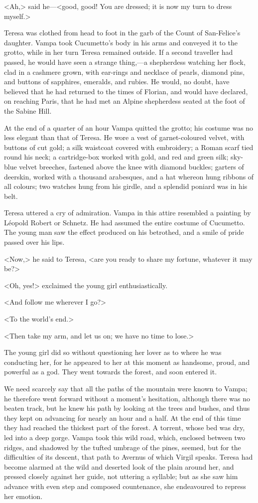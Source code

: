 {<Ah,> said he—<good, good! You are dressed; it is now my turn to dress myself.> 

Teresa was clothed from head to foot in the garb of the Count of San-Felice's daughter. Vampa took Cucumetto's body in his arms and conveyed it to the grotto, while in her turn Teresa remained outside. If a second traveller had passed, he would have seen a strange thing,—a shepherdess watching her flock, clad in a cashmere grown, with ear-rings and necklace of pearls, diamond pins, and buttons of sapphires, emeralds, and rubies. He would, no doubt, have believed that he had returned to the times of Florian, and would have declared, on reaching Paris, that he had met an Alpine shepherdess seated at the foot of the Sabine Hill. 

At the end of a quarter of an hour Vampa quitted the grotto; his costume was no less elegant than that of Teresa. He wore a vest of garnet-coloured velvet, with buttons of cut gold; a silk waistcoat covered with embroidery; a Roman scarf tied round his neck; a cartridge-box worked with gold, and red and green silk; sky-blue velvet breeches, fastened above the knee with diamond buckles; garters of deerskin, worked with a thousand arabesques, and a hat whereon hung ribbons of all colours; two watches hung from his girdle, and a splendid poniard was in his belt. 

Teresa uttered a cry of admiration. Vampa in this attire resembled a painting by Léopold Robert or Schnetz. He had assumed the entire costume of Cucumetto. The young man saw the effect produced on his betrothed, and a smile of pride passed over his lips. 

<Now,> he said to Teresa, <are you ready to share my fortune, whatever it may be?> 

<Oh, yes!> exclaimed the young girl enthusiastically. 

<And follow me wherever I go?> 

<To the world's end.> 

<Then take my arm, and let us on; we have no time to lose.> 

The young girl did so without questioning her lover as to where he was conducting her, for he appeared to her at this moment as handsome, proud, and powerful as a god. They went towards the forest, and soon entered it. 

We need scarcely say that all the paths of the mountain were known to Vampa; he therefore went forward without a moment's hesitation, although there was no beaten track, but he knew his path by looking at the trees and bushes, and thus they kept on advancing for nearly an hour and a half. At the end of this time they had reached the thickest part of the forest. A torrent, whose bed was dry, led into a deep gorge. Vampa took this wild road, which, enclosed between two ridges, and shadowed by the tufted umbrage of the pines, seemed, but for the difficulties of its descent, that path to Avernus of which Virgil speaks. Teresa had become alarmed at the wild and deserted look of the plain around her, and pressed closely against her guide, not uttering a syllable; but as she saw him advance with even step and composed countenance, she endeavoured to repress her emotion. 

}
